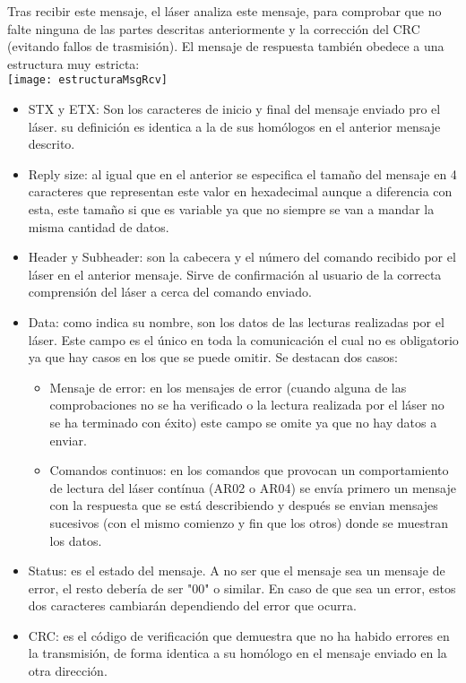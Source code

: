 Tras recibir este mensaje, el láser analiza este mensaje, para comprobar que no falte ninguna de las partes descritas anteriormente y la corrección del CRC (evitando fallos de trasmisión). El mensaje de respuesta también obedece a una estructura muy estricta:\\
\texttt{[image: estructuraMsgRcv]}
\begin{itemize}
	\item STX y ETX: Son los caracteres de inicio y final del mensaje enviado pro el láser. su definición es identica a la de sus homólogos en el anterior mensaje descrito.
	\item Reply size: al igual que en el anterior se especifica el tamaño del mensaje en 4 caracteres que representan este valor en hexadecimal aunque a diferencia con esta, este tamaño si que es variable ya que no siempre se van a mandar la misma cantidad de datos.
	\item Header y Subheader: son la cabecera y el número del comando recibido por el láser en el anterior mensaje. Sirve de confirmación al usuario de la correcta comprensión del láser a cerca del comando enviado.
	\item Data: como indica su nombre, son los datos de las lecturas realizadas por el láser. Este campo es el único en toda la comunicación el cual no es obligatorio ya que hay casos en los que se puede omitir. Se destacan dos casos:
	\begin{itemize}
		\item Mensaje de error: en los mensajes de error (cuando alguna de las comprobaciones no se ha verificado o la lectura realizada por el láser no se ha terminado con éxito) este campo se omite ya que no hay datos a enviar.
		\item Comandos continuos: en los comandos que provocan un comportamiento de lectura del láser contínua (AR02 o AR04) se envía primero un mensaje con la respuesta que se está describiendo y después se envian mensajes sucesivos (con el mismo comienzo y fin que los otros) donde se muestran los datos.
	\end{itemize}
	\item Status: es el estado del mensaje. A no ser que el mensaje sea un mensaje de error, el resto debería de ser "00" o similar. En caso de que sea un error, estos dos caracteres cambiarán dependiendo del error que ocurra.
	\item CRC: es el código de verificación que demuestra que no ha habido errores en la transmisión, de forma identica a su homólogo en el mensaje enviado en la otra dirección.
\end{itemize}
